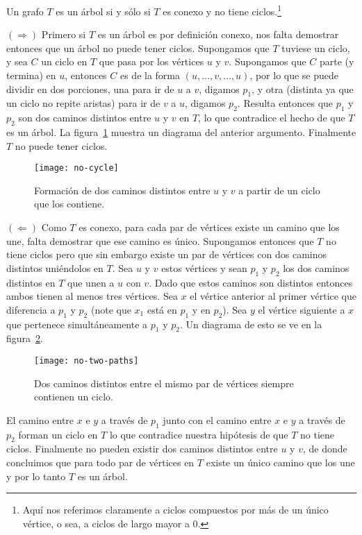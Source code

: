 \begin{teorema}
Un grafo $T$ es un árbol si y sólo si $T$ es conexo y no tiene ciclos.\footnote{Aquí nos referimos claramente a ciclos compuestos por más de un único vértice, o sea, a ciclos de largo mayor a 0.}

\begin{demostracion}
$(\Rightarrow)$ Primero si $T$ es un árbol es por definición conexo, nos falta demostrar entonces que un árbol no puede tener ciclos.
Supongamos que $T$ tuviese un ciclo, y sea $C$ un ciclo en $T$ que pasa por los vértices $u$ y $v$.
Supongamos que $C$ parte (y termina) en $u$, entonces $C$ es de la forma $(u,\ldots,v,\ldots,u)$, por lo que se puede dividir en dos porciones, una para ir de $u$ a $v$, digamos $p_1$, y otra (distinta ya que un ciclo no repite aristas) para ir de $v$ a $u$, digamos $p_2$.
Resulta entonces que $p_1$ y $p_2$ son dos caminos distintos entre $u$ y $v$ en $T$, lo que contradice el hecho de que $T$ es un árbol.
La figura~\ref{fig:no-cycle} muestra un diagrama del anterior argumento.
Finalmente $T$ no puede tener ciclos.
\begin{figure}[h!]
\centering
\texttt{[image: no-cycle]}
\caption{Formación de dos caminos distintos entre $u$ y $v$ a partir de un ciclo que los contiene.}
\label{fig:no-cycle}
\end{figure}

$(\Leftarrow)$ Como $T$ es conexo, para cada par de vértices existe un camino que los une, falta demostrar que ese camino es único.
Supongamos entonces que $T$ no tiene ciclos pero que sin embargo existe un par de vértices con dos caminos distintos uniéndolos en $T$.
Sea $u$ y $v$ estos vértices y sean $p_1$ y $p_2$ los dos caminos distintos en $T$ que unen a $u$ con $v$.
Dado que estos caminos son distintos entonces ambos tienen al menos tres vértices.
Sea $x$ el vértice anterior al primer vértice que diferencia a $p_1$ y $p_2$ (note que $x_1$ está en $p_1$ y en $p_2$).
Sea $y$ el vértice siguiente a $x$ que pertenece simultáneamente a $p_1$ y $p_2$.
Un diagrama de esto se ve en la figura~\ref{fig:no-two-paths}.
\begin{figure}[h!]
\centering
\texttt{[image: no-two-paths]}
\caption{Dos caminos distintos entre el mismo par de vértices siempre contienen un ciclo.}
\label{fig:no-two-paths}
\end{figure}
El camino entre $x$ e $y$ a través de $p_1$ junto con el camino entre $x$ e $y$ a través de $p_2$ forman un ciclo en $T$ lo que contradice nuestra hipótesis de que $T$ no tiene ciclos.
Finalmente no pueden existir dos caminos distintos entre $u$ y $v$, de donde concluimos que para todo par de vértices en $T$ existe un único camino que los une y por lo tanto $T$ es un árbol.
\end{demostracion}
\end{teorema}

